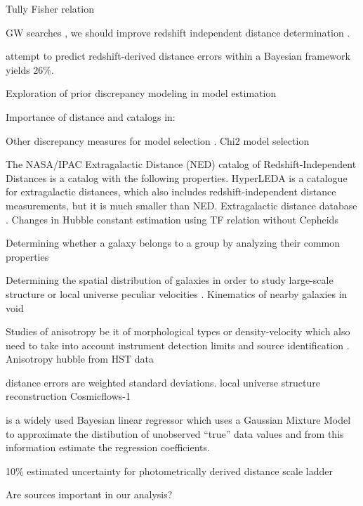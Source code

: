 \documentclass[a4paper,fleqn,usenatbib]{mnras}
\begin{document}
Tully Fisher relation \citet{precisetf}

GW searches \citet{gwgallist}, we should improve redshift independent distance determination .

\citet{6df} attempt to predict redshift-derived distance errors within a Bayesian framework yields 26\%.

Exploration of prior discrepancy modeling in model estimation \citet{priordisc}

Importance of distance and catalogs \citet{catetg,catspi} in:

Other discrepancy measures for model selection \citet{otherdisc}. Chi2 model selection \citet{chi2ms}

The NASA/IPAC Extragalactic Distance (NED) catalog of Redshift-Independent Distances \citet{ned07,ned} is  a catalog with the following properties. HyperLEDA \citet{hyperleda} is a catalogue for extragalactic distances, which also includes redshift-independent distance measurements, but it is much smaller than NED. Extragalactic distance database \citet{distdb}. Changes in Hubble constant estimation using TF relation without Cepheids \citet{noceph}

Determining whether a galaxy belongs to a group by analyzing their common properties \citet{gg3500} 

Determining the spatial distribution of galaxies in order to study large-scale structure \citet{gallargescale} or local universe peculiar velocities \citet{localunipv}. Kinematics of nearby galaxies in void \citet{void}

Studies of anisotropy be it of morphological types \citet{morphanis} or density-velocity \citet{nongauss} which also need to take into account instrument detection limits \citet{catmatch} and source identification \citet{baymatch}. Anisotropy hubble from HST data \citet{anishub}

\citet{cosmicflows} distance errors are weighted standard deviations. \citet{locunivcf} local universe structure reconstruction Cosmicflows-1

\citet{gmastro} is a widely used Bayesian linear regressor which uses a Gaussian Mixture Model to approximate the distibution of unobserved ``true'' data values and from this information estimate the regression coefficients.

10\% estimated uncertainty for photometrically derived distance scale ladder \citet{hubunc}

Are \citet{2mass} sources important in our analysis?
\end{document}
